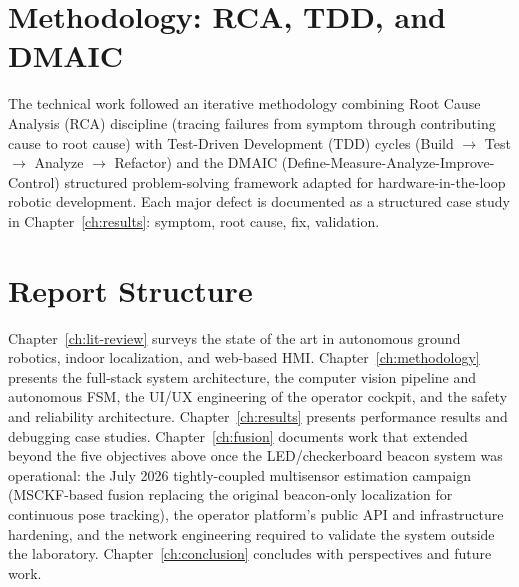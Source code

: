 \section{Methodology: RCA, TDD, and DMAIC}

The technical work followed an iterative methodology combining Root Cause Analysis (RCA) discipline (tracing failures from symptom through contributing cause to root cause) with Test-Driven Development (TDD) cycles (Build $\rightarrow$ Test $\rightarrow$ Analyze $\rightarrow$ Refactor) and the DMAIC (Define-Measure-Analyze-Improve-Control) structured problem-solving framework adapted for hardware-in-the-loop robotic development. Each major defect is documented as a structured case study in Chapter~\ref{ch:results}: symptom, root cause, fix, validation.

\section{Report Structure}

Chapter~\ref{ch:lit-review} surveys the state of the art in autonomous ground robotics, indoor localization, and web-based HMI. Chapter~\ref{ch:methodology} presents the full-stack system architecture, the computer vision pipeline and autonomous FSM, the UI/UX engineering of the operator cockpit, and the safety and reliability architecture. Chapter~\ref{ch:results} presents performance results and debugging case studies. Chapter~\ref{ch:fusion} documents work that extended beyond the five objectives above once the LED/checkerboard beacon system was operational: the July 2026 tightly-coupled multisensor estimation campaign (MSCKF-based fusion replacing the original beacon-only localization for continuous pose tracking), the operator platform's public API and infrastructure hardening, and the network engineering required to validate the system outside the laboratory. Chapter~\ref{ch:conclusion} concludes with perspectives and future work.
